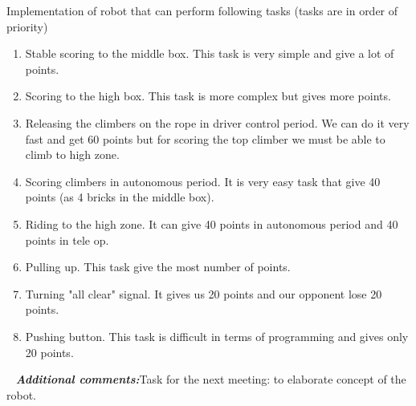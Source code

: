 \begin{enumerate*}
\begin{enumerate}
\begin{enumerate}
		\end{enumerate}
	\end{enumerate}
	\item Implementation of robot that can perform following tasks (tasks are in order of priority)
	\begin{enumerate}
		\item Stable scoring to the middle box. This task is very simple and give a lot of points.
		\item Scoring to the high box. This task is more complex but gives more points.
		\item Releasing the climbers on the rope in driver control period. We can do it very fast and get 60 points but for scoring the top climber we must be able to climb to high zone.
		\item Scoring climbers in autonomous period. It is very easy task that give 40 points (as 4 bricks in the middle box).
		\item Riding to the high zone. It can give 40 points in autonomous period and 40 points in tele op.
		\item Pulling up. This task give the most number of points.
		\item Turning "all clear" signal. It gives us 20 points and our opponent lose 20 points.
		\item Pushing button. This task is difficult in terms of programming and gives only 20 points.
	\end{enumerate}
	
	 \newline
	\textit{\textbf{Additional comments:}}Task for the next meeting: to elaborate concept of the robot.
	
\end{enumerate*}





\fillpage
